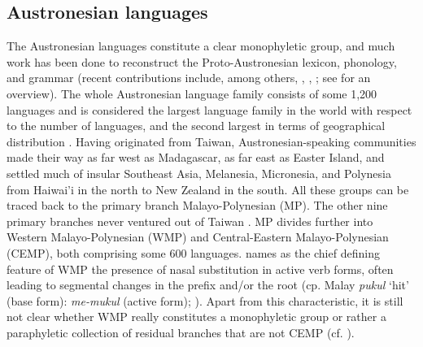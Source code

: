 \subsection{Austronesian languages}


The Austronesian languages constitute a clear monophyletic group, and much work has been done to reconstruct the Proto-Austronesian lexicon, phonology, and grammar (recent contributions include, among others, \citealt{Tryon1995}, \citealt{wouk2002history}, \citealt{blust2009austronesian}; see \citealt{adelaar2005austronesian} for an overview). The whole Austronesian language family consists of some 1,200 languages and is considered the largest language family in the world with respect to the number of languages, and the second largest in terms of geographical distribution \citep{adelaar2005austronesian}. Having originated from Taiwan, Austronesian-speaking communities made their way as far west as Madagascar, as far east as Easter Island, and settled much of insular Southeast Asia, Melanesia, Micronesia, and Polynesia from Haiwai'i in the north to New Zealand in the south. All these groups can be traced back to the primary branch Malayo-Polynesian (MP). The other nine primary branch\-es never ventured out of Taiwan \citep{blust2009austronesian}. MP divides further into Western Malayo-Polynesian (WMP) and Central-Eastern Malayo-Polynesian (CEMP), both comprising some 600 languages. \citet{blust2009austronesian} names as the chief defining feature of WMP the presence of nasal substitution in active verb forms, often leading to segmental changes in the prefix and/or the root (cp. Malay \textit{pukul} `hit' (base form): \textit{me-mukul} (active form); \citealt[30]{blust2009austronesian}). Apart from this characteristic, it is still not clear whether WMP really constitutes a monophyletic group or rather a paraphyletic collection of residual branches that are not CEMP (cf. \citealt[30]{blust2009austronesian}). 





